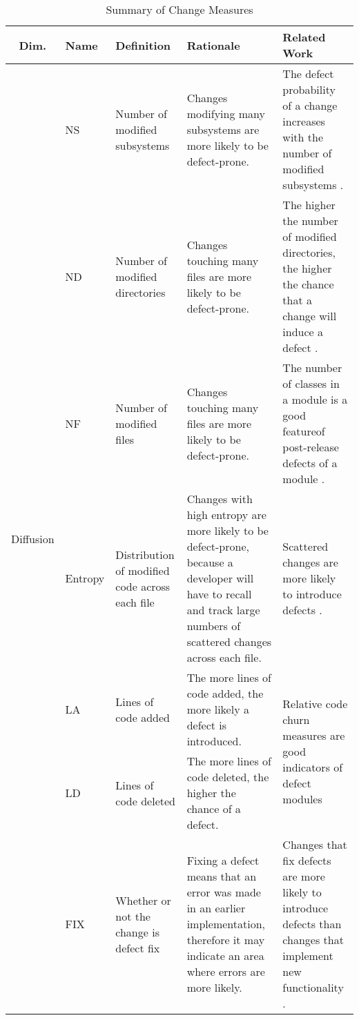 \documentclass[10pt, conference]{IEEEtran}
\begin{document}
\begin{table*}[t]
	\centering
	\caption{Summary of Change Measures}
	\begin{tabular}{|c|l|p{2.5cm}|p{5.5cm}|p{5.25cm}|}
		\hline Dim. & Name & Definition & Rationale & Related Work \\ 
		\hline \multirow{14}{*}{\begin{sideways}Diffusion\end{sideways}} & NS & Number of modified subsystems  & Changes modifying many subsystems are more likely to be defect-prone. & The defect probability of a change increases with the number of modified subsystems \cite{Mockus2000Bell}. \\ \cline{2-5}  
		& ND & Number of modified directories & Changes touching many files are more likely to be defect-prone. & The higher the number of modified directories, the higher the chance that a change will induce a defect \cite{Mockus2000Bell}. \\ \cline{2-5}  
		& NF & Number of modified files & Changes touching many files are more likely to be defect-prone. & The number of classes in a module is a good featureof post-release defects of a module \cite{Nagappan2006ICSE}. \\ \cline{2-5} 
		& Entropy & Distribution of modified code across each file & Changes with high entropy are more likely to be defect-prone, because a developer will have to recall and track large numbers of scattered changes across each file. & Scattered changes are more likely to introduce defects \cite{DAmbross2010MSR, Hassan2009ICSE}. \\ 
		\hline \multirow{4}{*}{\begin{sideways}Size\end{sideways}} & LA & Lines of code added & The more lines of code added, the more likely a defect is introduced. & \multirow{2}{5.25cm}{Relative code churn measures are good indicators of defect modules \cite{Moser2008ICSE, Nagappan2005ICSE}}. \\ \cline{2-4} 
		& LD & Lines of code deleted & The more lines of code deleted, the higher the chance of a defect. &  \\ 
		\hline \multirow{4}{*}{\begin{sideways}Purpose\end{sideways}} & FIX & Whether or not the change is defect fix & Fixing a defect means that an error was made in an earlier implementation, therefore it may indicate an area where errors are more likely. & Changes that fix defects are more likely to introduce defects than changes that implement new functionality \cite{Guo2010ICSE, Purushothaman2005IEEE}. \\ 

\end{tabular}
\end{table*}
\end{document}
